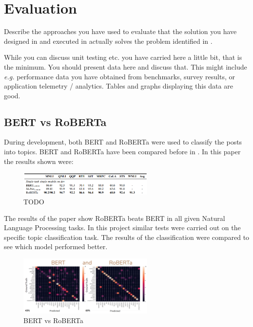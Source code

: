 \chapter{Evaluation}
\label{ch:evaluation}

Describe the approaches you have used to evaluate that the solution you have designed in  and executed in  actually solves the problem identified in .

While you can discuss unit testing etc. you have carried here a little bit, that is the minimum. You should present data here and discuss that. This might include \emph{e.g.} performance data you have obtained from benchmarks, survey results, or application telemetry / analytics. Tables and graphs displaying this data are good.

\section{BERT vs RoBERTa}
During development, both BERT and RoBERTa were used to classify the posts into topics.
BERT and RoBERTa have been compared before in \cite{}. In this paper the results shown were:
\begin{figure}
    \centering
    \includegraphics[width=0.6\textwidth]{../images/roberta-tasks.png}
    \caption{TODO}
    \label{fig:bert-vs-roberta-paper}
\end{figure}

The results of the paper show RoBERTa beats BERT in all given Natural Language Processing tasks. In this project similar tests
were carried out on the specific topic classification task. The results of the classification were
compared to see which model performed better.
\begin{figure}[hbtp]
    \centering
    \includegraphics[width=0.6\textwidth]{../images/bert-vs-roberta.png}
    \caption{BERT vs RoBERTa}
    \label{fig:bert-vs-roberta}
\end{figure}

